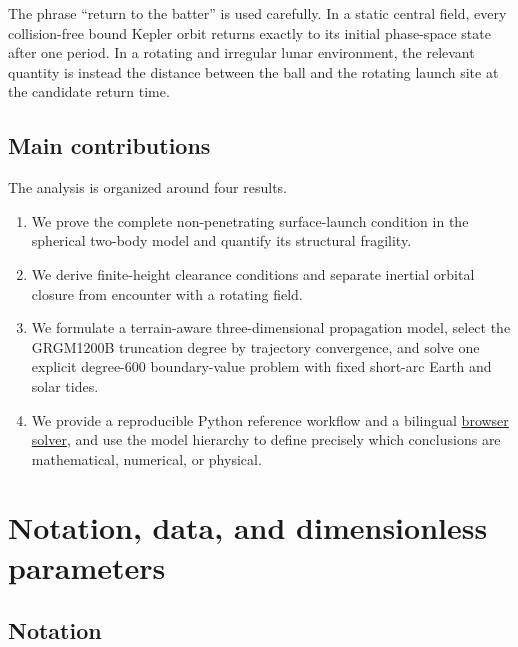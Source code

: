 The phrase ``return to the batter'' is used carefully. In a static central field, every collision-free bound Kepler orbit returns exactly to its initial phase-space state after one period. In a rotating and irregular lunar environment, the relevant quantity is instead the distance between the ball and the rotating launch site at the candidate return time.

\subsection{Main contributions}

The analysis is organized around four results.
\begin{enumerate}
    \item We prove the complete non-penetrating surface-launch condition in the spherical two-body model and quantify its structural fragility.
    \item We derive finite-height clearance conditions and separate inertial orbital closure from encounter with a rotating field.
    \item We formulate a terrain-aware three-dimensional propagation model, select the GRGM1200B truncation degree by trajectory convergence, and solve one explicit degree-600 boundary-value problem with fixed short-arc Earth and solar tides.
    \item We provide a reproducible Python reference workflow and a bilingual \href{https://kimonlu.github.io/PHYS1600J-Project-The-Orbital-Home-Run/}{browser solver}, and use the model hierarchy to define precisely which conclusions are mathematical, numerical, or physical.
\end{enumerate}

\section{Notation, data, and dimensionless parameters}

\subsection{Notation}
\FloatBarrier

